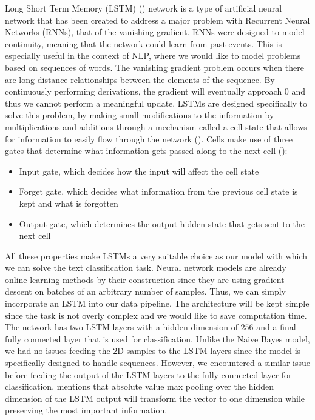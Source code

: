 \documentclass[12pt]{extreport}
\begin{document}
Long Short Term Memory (LSTM) (\cite{lstm}) network is a type of artificial neural network that has been created to address a major problem with Recurrent Neural Networks (RNNs), that of the vanishing gradient. RNNs were designed to model continuity, meaning that the network could learn from past events. This is especially useful in the context of NLP, where we would like to model problems based on sequences of words. The vanishing gradient problem occurs when there are long-distance relationships between the elements of the sequence. By continuously performing derivations, the gradient will eventually approach 0 and thus we cannot perform a meaningful update. LSTMs are designed specifically to solve this problem, by making small modifications to the information by multiplications and additions through a mechanism called a cell state that allows for information to easily flow through the network (\cite{lstmrnnfundamentals}). Cells make use of three gates that determine what information gets passed along to the next cell (\cite{colahlstm}):

\begin{itemize}
    \item Input gate, which decides how the input will affect the cell state
    \item Forget gate, which decides what information from the previous cell state is kept and what is forgotten
    \item Output gate, which determines the output hidden state that gets sent to the next cell
\end{itemize}

All these properties make LSTMs a very suitable choice as our model with which we can solve the text classification task. Neural network models are already online learning methods by their construction since they are using gradient descent on batches of an arbitrary number of samples. Thus, we can simply incorporate an LSTM into our data pipeline. The architecture will be kept simple since the task is not overly complex and we would like to save computation time. The network has two LSTM layers with a hidden dimension of $256$ and a final fully connected layer that is used for classification. Unlike the Naive Bayes model, we had no issues feeding the 2D samples to the LSTM layers since the model is specifically designed to handle sequences. However, we encountered a similar issue before feeding the output of the LSTM layers to the fully connected layer for classification. \cite{maxpoolinglstm} mentions that absolute value max pooling over the hidden dimension of the LSTM output will transform the vector to one dimension while preserving the most important information.
\end{document}
